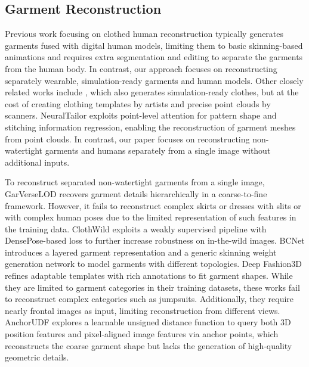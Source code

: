 \subsection{Garment Reconstruction}

Previous work focusing on clothed human reconstruction \cite{xiu2022icon, xiu2023econ} typically generates garments fused with digital human models, limiting them to basic skinning-based animations and requires extra segmentation and editing to separate the garments from the human body. In contrast, our approach focuses on reconstructing separately wearable, simulation-ready garments and human models. Other closely related works include \citet{li2024diffavatar}, which also generates simulation-ready clothes, but at the cost of creating clothing templates by artists and precise point clouds by scanners. NeuralTailor \cite{korosteleva2022neuraltailor} exploits point-level attention for pattern shape and stitching information regression, enabling the reconstruction of garment meshes from point clouds. In contrast, our paper focuses on reconstructing non-watertight garments and humans separately from a single image without additional inputs. 

To reconstruct separated non-watertight garments from a single image, GarVerseLOD \cite{luo2024garverselod} recovers garment details hierarchically in a coarse-to-fine framework. However, it fails to reconstruct complex skirts or dresses with slits or with complex human poses due to the limited representation of such features in the training data. ClothWild \cite{moon20223d} exploits a weakly supervised pipeline with DensePose-based loss to further increase robustness on in-the-wild images. BCNet \cite{jiang2020bcnet} introduces a layered garment representation and a generic skinning weight generation network to model garments with different topologies. Deep Fashion3D \cite{zhu2020deep} refines adaptable templates with rich annotations to fit garment shapes. While they are limited to garment categories in their training datasets, these works fail to reconstruct complex categories such as jumpsuits. Additionally, they require nearly frontal images as input, limiting reconstruction from different views. AnchorUDF \cite{zhao2021learning} explores a learnable unsigned distance function to query both 3D position features and pixel-aligned image features via anchor points, which reconstructs the coarse garment shape but lacks the generation of high-quality geometric details.

